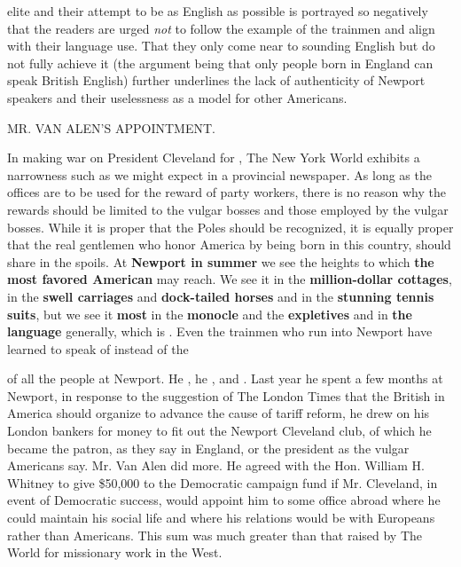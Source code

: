 elite and their attempt to be as English as possible is portrayed so negatively that the readers are urged \emph{not} to follow the example of the trainmen and align with their language use. That they only come near to sounding English but do not fully achieve it (the argument being that only people born in England can speak British English) further underlines the lack of authenticity of Newport speakers and their uselessness as a model for other Americans.

\begin{ipquote}
\begin{center}
MR. VAN ALEN’S APPOINTMENT.    
\end{center}
In making war on President Cleveland for , The New York World exhibits a narrowness such as we might expect in a provincial newspaper. As long as the offices are to be used for the reward of party workers, there is no reason why the rewards should be limited to the vulgar bosses and those employed by the vulgar bosses. While it is proper that the Poles should be recognized, it is equally proper that the real gentlemen who honor America by being born in this country, should share in the spoils. At \textbf{Newport in summer} we see the heights to which \textbf{the most favored American} may reach. We see it in the \textbf{million-dollar cottages}, in the \textbf{swell carriages} and \textbf{dock-tailed horses} and in the \textbf{stunning tennis suits}, but we see it \textbf{most} in the \textbf{monocle} and the \textbf{expletives} and in \textbf{the language} generally, which is . Even the trainmen who run into Newport have learned to speak of  instead of the 

 of all the people at Newport. He , he , and . Last year he spent a few months at Newport, in response to the suggestion of The London Times that the British in America should organize to advance the cause of tariff reform, he drew on his London bankers for money to fit out the Newport Cleveland club, of which he became the patron, as they say in England, or the president as the vulgar Americans say. Mr. Van Alen did more. He agreed with the Hon. William H. Whitney to give \$50,000 to the Democratic campaign fund if Mr. Cleveland, in event of Democratic success, would appoint him to some office abroad where he could maintain his social life and where his relations would be with Europeans rather than Americans. This sum was much greater than that raised by The World for missionary work in the West.


\end{ipquote}
